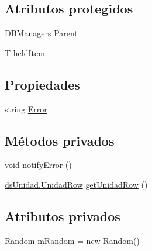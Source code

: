 \subsection*{Atributos protegidos}
\begin{DoxyCompactItemize}
\item 
\hyperlink{class_proyecto___integrador__3_1_1_d_b_managers}{D\-B\-Managers} \hyperlink{class_proyecto___integrador__3_1_1_d_b_managers_1_1_d_b_manager_3_01_t_01_4_a06315e75298c8f2fd46f32dc7c9a80b2}{Parent}
\item 
T \hyperlink{class_proyecto___integrador__3_1_1_d_b_managers_1_1_d_b_manager_3_01_t_01_4_a3b67ae3b5b3b9c3793d56c1407d7dcff}{held\-Item}
\end{DoxyCompactItemize}
\subsection*{Propiedades}
\begin{DoxyCompactItemize}
\item 
string \hyperlink{class_proyecto___integrador__3_1_1_d_b_managers_1_1_d_b_manager_3_01_t_01_4_a6e5caaed2ee1a4d067dfbf5aaa1b1fa8}{Error}
\end{DoxyCompactItemize}
\subsection*{Métodos privados}
\begin{DoxyCompactItemize}
\item 
void \hyperlink{class_proyecto___integrador__3_1_1_d_b_managers_1_1_unidad_d_b_manager_a66e784407434adeb164e8af42c00f6e8}{notify\-Error} ()
\item 
\hyperlink{class_proyecto___integrador__3_1_1ds_unidad_1_1_unidad_row}{ds\-Unidad.\-Unidad\-Row} \hyperlink{class_proyecto___integrador__3_1_1_d_b_managers_1_1_unidad_d_b_manager_a53759469921aa97e47261fe1692224a2}{get\-Unidad\-Row} ()
\end{DoxyCompactItemize}
\subsection*{Atributos privados}
\begin{DoxyCompactItemize}
\item 
Random \hyperlink{class_proyecto___integrador__3_1_1_d_b_managers_1_1_unidad_d_b_manager_a36c1b477b9264ffd517c6d2f736d76f4}{m\-Random} = new Random()
\end{DoxyCompactItemize}



